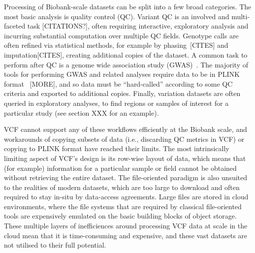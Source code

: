 \documentclass[a4paper,num-refs]{oup-contemporary}
\begin{document}
Processing of Biobank-scale datasets can be split into a 
few broad categories. The most basic analysis 
is quality control (QC). Variant QC is an 
involved and multi-faceted 
task [CITATIONS?], often requiring interactive, exploratory analysis
and incurring substantial computation over multiple QC fields.
Genotype calls are often refined via statistical methods,
for example by phasing~[CITES] and imputation[CITES], 
creating additional copies of the dataset.
A common task to perform after QC is 
a genome wide association study (GWAS)~\cite{uffelmann2021genome}. 
The majority of tools for 
performing GWAS and related analyses require
data to be in PLINK format~\cite[e.g][]{chang2015second} [MORE],
and so data must be ``hard-called'' according to some QC criteria
and exported to additional copies.
Finally, variation datasets are often queried in exploratory
analyses, to find regions or samples of interest for a particular 
study (see section XXX for an example).

VCF cannot support any of these workflows efficiently
at the Biobank scale, and workarounds of copying subsets 
of data (i.e., discarding QC metrics in VCF) or copying to 
PLINK format have reached their limits.
The most intrinsically limiting aspect of VCF's design 
is its row-wise layout of data, which means that (for example)
information for a particular sample or field cannot be obtained without
retrieving the entire dataset.
The file-oriented paradigm is also unsuited to the realities 
of modern datasets, which are too large to download and 
often required to stay in-situ by data-access agreements.
Large files are stored in cloud environments, where the 
file systems that are required by classical file-oriented tools
are expensively emulated on the basic building blocks
of object storage. 
These multiple layers of inefficiences around processing
VCF data at scale in the cloud mean that it is 
time-consuming and expensive, and these vast datasets are 
not utilised to their full potential.
\end{document}
